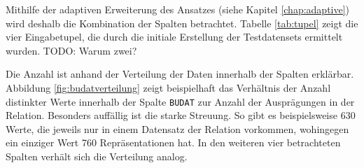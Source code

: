 Mithilfe der adaptiven Erweiterung des Ansatzes (siehe Kapitel \ref{chap:adaptive}) wird deshalb die Kombination der Spalten betrachtet.
Tabelle \ref{tab:tupel} zeigt die vier Eingabetupel, die durch die initiale Erstellung der Testdatensets ermittelt wurden.
TODO: Warum zwei?
\begin{table}[ht]
	\centering
	\caption{Gefundene Tupel für Testdatensets inklusive Ausführungszeiten}
	\label{tab:tupel}
\end{table}

Die Anzahl ist anhand der Verteilung der Daten innerhalb der Spalten erklärbar.
Abbildung \ref{fig:budatverteilung} zeigt beispielhaft das Verhältnis der Anzahl distinkter Werte innerhalb der Spalte \texttt{BUDAT} zur Anzahl der Ausprägungen in der Relation.
Besonders auffällig ist die starke Streuung.
So gibt es beispielsweise 630 Werte, die jeweils nur in einem Datensatz der Relation vorkommen, wohingegen ein einziger Wert 760 Repräsentationen hat.
In den weiteren vier betrachteten Spalten verhält sich die Verteilung analog.

